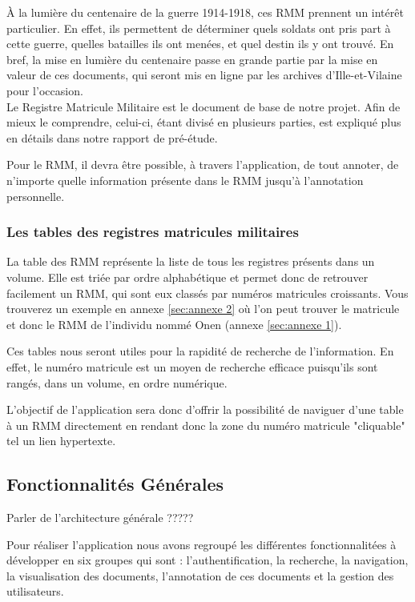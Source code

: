 \documentclass[a4paper]{article}
\begin{document}
	\`A la lumière du centenaire de la guerre 1914-1918, ces RMM prennent un intérêt particulier. En effet, ils permettent de déterminer quels soldats ont pris part à cette guerre, quelles batailles ils ont menées, et quel destin ils y ont trouvé. En bref, la mise en lumière du centenaire passe en grande partie par la mise en valeur de ces documents, qui seront mis en ligne par les archives d'Ille-et-Vilaine pour l'occasion.\\

	Le Registre Matricule Militaire est le document de base de notre projet. Afin de mieux le comprendre, celui-ci, étant divisé en plusieurs parties, est expliqué plus en détails dans notre rapport de pré-étude.

	Pour le RMM, il devra être possible, à travers l'application, de tout annoter, de n'importe quelle information présente dans le RMM jusqu'à l'annotation personnelle. 

\subsubsection{Les tables des registres matricules militaires}
	La table des RMM représente la liste de tous les registres présents dans un volume. Elle est triée par ordre alphabétique et permet donc de retrouver facilement un RMM, qui sont eux classés par numéros matricules croissants. Vous trouverez un exemple en annexe \ref{sec:annexe 2} où l'on peut trouver le matricule et donc le RMM de l'individu nommé Onen (annexe \ref{sec:annexe 1}).

	Ces tables nous seront utiles pour la rapidité de recherche de l'information. En effet, le numéro matricule est un moyen de recherche efficace puisqu'ils sont rangés, dans un volume, en ordre numérique. 

	L'objectif de l'application sera donc d'offrir la possibilité de naviguer d'une table à un RMM directement en rendant donc la zone du numéro matricule "cliquable" tel un lien hypertexte.

\subsection{Fonctionnalités Générales}

	Parler de l'architecture générale ?????
 
	Pour réaliser l'application nous avons regroupé les différentes fonctionnalitées à développer en six groupes qui sont : l'authentification, la recherche, la navigation, la visualisation des documents, l'annotation de ces documents et la gestion des utilisateurs. 
\end{document}
